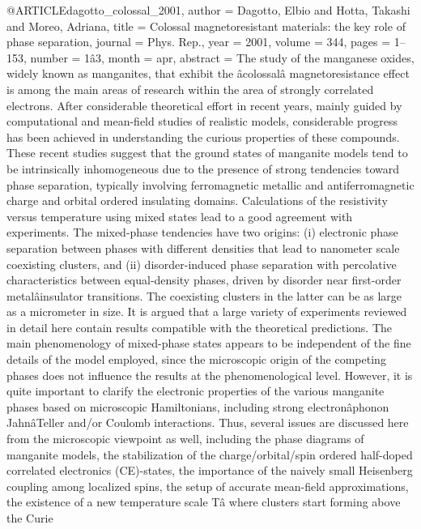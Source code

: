 @ARTICLE{dagotto_colossal_2001,
  author = {Dagotto, Elbio and Hotta, Takashi and Moreo, Adriana},
  title = {Colossal magnetoresistant materials: the key role of phase separation},
  journal = {Phys. Rep.},
  year = {2001},
  volume = {344},
  pages = {1--153},
  number = {1â3},
  month = apr,
  abstract = {The study of the manganese oxides, widely known as manganites, that
	exhibit the âcolossalâ magnetoresistance effect is among the
	main areas of research within the area of strongly correlated electrons.
	After considerable theoretical effort in recent years, mainly guided
	by computational and mean-field studies of realistic models, considerable
	progress has been achieved in understanding the curious properties
	of these compounds. These recent studies suggest that the ground
	states of manganite models tend to be intrinsically inhomogeneous
	due to the presence of strong tendencies toward phase separation,
	typically involving ferromagnetic metallic and antiferromagnetic
	charge and orbital ordered insulating domains. Calculations of the
	resistivity versus temperature using mixed states lead to a good
	agreement with experiments. The mixed-phase tendencies have two origins:
	(i) electronic phase separation between phases with different densities
	that lead to nanometer scale coexisting clusters, and (ii) disorder-induced
	phase separation with percolative characteristics between equal-density
	phases, driven by disorder near first-order metalâinsulator transitions.
	The coexisting clusters in the latter can be as large as a micrometer
	in size. It is argued that a large variety of experiments reviewed
	in detail here contain results compatible with the theoretical predictions.
	The main phenomenology of mixed-phase states appears to be independent
	of the fine details of the model employed, since the microscopic
	origin of the competing phases does not influence the results at
	the phenomenological level. However, it is quite important to clarify
	the electronic properties of the various manganite phases based on
	microscopic Hamiltonians, including strong electronâphonon {JahnâTeller}
	and/or Coulomb interactions. Thus, several issues are discussed here
	from the microscopic viewpoint as well, including the phase diagrams
	of manganite models, the stabilization of the charge/orbital/spin
	ordered half-doped correlated electronics ({CE)-states}, the importance
	of the naively small Heisenberg coupling among localized spins, the
	setup of accurate mean-field approximations, the existence of a new
	temperature scale Tâ where clusters start forming above the Curie
}}
